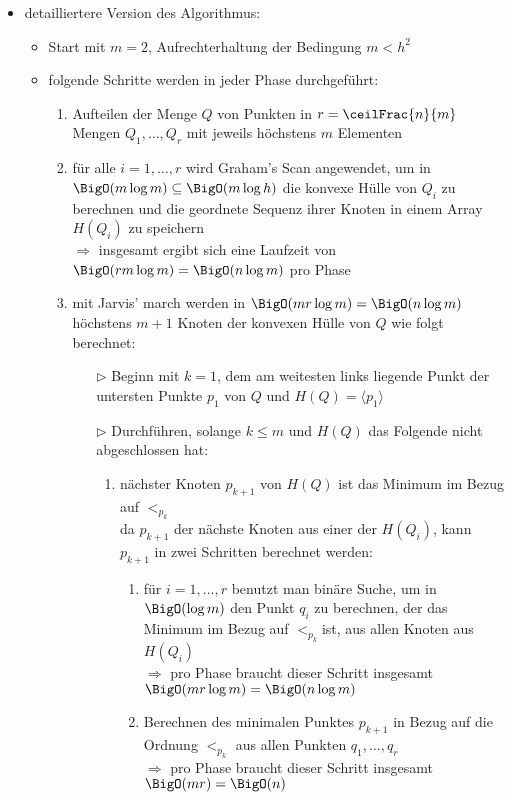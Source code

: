 \begin{itemize}
	\item detailliertere Version des Algorithmus:
		\begin{itemize}[itemsep=-2pt]
			\item Start mit $m=2$, Aufrechterhaltung der Bedingung $m < h^2$
			\item folgende Schritte werden in jeder Phase durchgeführt:
				\begin{enumerate}[itemsep=-2pt]
					\item Aufteilen der Menge $Q$ von Punkten in $r=\ceilFrac{n}{m}$ Mengen $Q_1,\dots,Q_r$ mit jeweils höchstens $m$ Elementen
					\item für alle $i=1,\dots,r$ wird Graham's Scan angewendet, um in $\BigO(m\log m)\subseteq \BigO(m\log h)$ die konvexe Hülle von $Q_i$ zu berechnen und die geordnete Sequenz ihrer Knoten in einem Array $H(Q_i)$ zu speichern\\
					$\Rightarrow$ insgesamt ergibt sich eine Laufzeit von $\BigO(rm\log m)=\BigO(n\log m)$ pro Phase
					\item mit Jarvis' march werden in $\BigO(mr\log m)=\BigO(n\log m)$ höchstens $m+1$ Knoten der konvexen Hülle von $Q$ wie folgt berechnet:
						\begin{itemize}
							\item[$\rhd$] Beginn mit $k=1$, dem am weitesten links liegende Punkt der untersten Punkte $p_1$ von $Q$ und $H(Q)=\langle p_1\rangle$
							\item[$\rhd$] Durchführen, solange $k\leq m$ und $H(Q)$ das Folgende nicht abgeschlossen hat:
								\begin{enumerate}
									\item nächster Knoten $p_{k+1}$ von $H(Q)$ ist das Minimum im Bezug auf $<_{p_k}$\\
									da $p_{k+1}$ der nächste Knoten aus einer der $H(Q_i)$, kann $p_{k+1}$ in zwei Schritten berechnet werden:
										\begin{enumerate}
											\item für $i=1,\dots, r$ benutzt man binäre Suche, um in $\BigO(\log m)$ den Punkt $q_i$ zu berechnen, der das Minimum im Bezug auf $<_{p_k}$ist, aus allen Knoten aus $H(Q_i)$\\
											$\Rightarrow$ pro Phase braucht dieser Schritt insgesamt $\BigO(mr\log m)=\BigO(n\log m)$
											\item Berechnen des minimalen Punktes $p_{k+1}$ in Bezug auf die Ordnung $<_{p_k}$ aus allen Punkten $q_1,\dots,q_r$\\
											$\Rightarrow$ pro Phase braucht dieser Schritt insgesamt $\BigO(mr)=\BigO(n)$

\end{enumerate}
\end{enumerate}
\end{itemize}
\end{enumerate}
\end{itemize}
\end{itemize}

